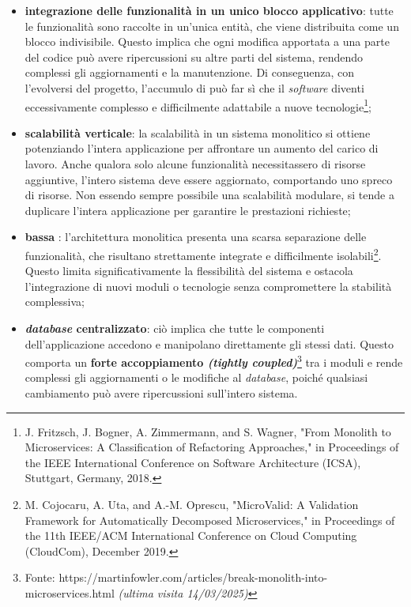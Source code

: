             \begin{itemize}
                \item \textbf{integrazione delle funzionalità in un unico blocco applicativo}: tutte le funzionalità sono raccolte in un'unica entità, che viene distribuita come un blocco indivisibile. Questo implica che ogni modifica apportata a una parte del codice può avere ripercussioni su altre parti del sistema, rendendo complessi gli aggiornamenti e la manutenzione. Di conseguenza, con l'evolversi del progetto, l'accumulo di  può far sì che il \textit{software} diventi eccessivamente complesso e difficilmente adattabile a nuove tecnologie\footnote{J. Fritzsch, J. Bogner, A. Zimmermann, and S. Wagner, "From Monolith to Microservices: A Classification of Refactoring Approaches," in Proceedings of the IEEE International Conference on Software Architecture (ICSA), Stuttgart, Germany, 2018.};
                \item  \textbf{scalabilità verticale}: la scalabilità in un sistema monolitico si ottiene potenziando l'intera applicazione per affrontare un aumento del carico di lavoro. Anche qualora solo alcune funzionalità necessitassero di risorse aggiuntive, l'intero sistema deve essere aggiornato, comportando uno spreco di risorse. Non essendo sempre possibile una scalabilità modulare, si tende a duplicare l'intera applicazione per garantire le prestazioni richieste;
                \item \textbf{bassa} : l'architettura monolitica presenta una scarsa separazione delle funzionalità, che risultano strettamente integrate e difficilmente isolabili\footnote{M. Cojocaru, A. Uta, and A.-M. Oprescu, "MicroValid: A Validation Framework for Automatically Decomposed Microservices," in Proceedings of the 11th IEEE/ACM International Conference on Cloud Computing (CloudCom), December 2019.}. Questo limita significativamente la flessibilità del sistema e ostacola l'integrazione di nuovi moduli o tecnologie senza compromettere la stabilità complessiva; 
                \item \textbf{\textit{database} centralizzato}: ciò implica che tutte le componenti dell'applicazione accedono e manipolano direttamente gli stessi dati. Questo comporta un \textbf{forte accoppiamento \textit{(tightly coupled)}}\footnote{Fonte: https://martinfowler.com/articles/break-monolith-into-microservices.html \textit{(ultima visita 14/03/2025)}} tra i moduli e rende complessi gli aggiornamenti o le modifiche al \textit{database}, poiché qualsiasi cambiamento può avere ripercussioni sull'intero sistema.
            \end{itemize}  


